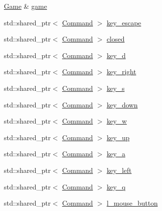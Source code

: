 \begin{DoxyCompactItemize}
\item 
\hyperlink{class_game}{Game} \& \hyperlink{class_engine_input_handler_a449d615b9968227381db153f57b7299d}{game}
\item 
std\+::shared\+\_\+ptr$<$ \hyperlink{class_command}{Command} $>$ \hyperlink{class_engine_input_handler_a864479881a1e214952f4a2aea3a307bf}{key\+\_\+escape}
\item 
std\+::shared\+\_\+ptr$<$ \hyperlink{class_command}{Command} $>$ \hyperlink{class_engine_input_handler_a0795da79edb03ad26aa5d8aec9fc2a04}{closed}
\item 
std\+::shared\+\_\+ptr$<$ \hyperlink{class_command}{Command} $>$ \hyperlink{class_engine_input_handler_a54e54d55b3fb0b52efcebe616849cdd1}{key\+\_\+d}
\item 
std\+::shared\+\_\+ptr$<$ \hyperlink{class_command}{Command} $>$ \hyperlink{class_engine_input_handler_ad74ef644e2130ed5552173993a358b20}{key\+\_\+right}
\item 
std\+::shared\+\_\+ptr$<$ \hyperlink{class_command}{Command} $>$ \hyperlink{class_engine_input_handler_ac8cb7f400955f76a2258a64f0812c309}{key\+\_\+s}
\item 
std\+::shared\+\_\+ptr$<$ \hyperlink{class_command}{Command} $>$ \hyperlink{class_engine_input_handler_a6812313632a9cf68132b99b4179ab1a4}{key\+\_\+down}
\item 
std\+::shared\+\_\+ptr$<$ \hyperlink{class_command}{Command} $>$ \hyperlink{class_engine_input_handler_adc4f776b64656ce3b549a1efcbba5dfb}{key\+\_\+w}
\item 
std\+::shared\+\_\+ptr$<$ \hyperlink{class_command}{Command} $>$ \hyperlink{class_engine_input_handler_a325f37f96aee129b9fc375c7a784798e}{key\+\_\+up}
\item 
std\+::shared\+\_\+ptr$<$ \hyperlink{class_command}{Command} $>$ \hyperlink{class_engine_input_handler_ae2da02fb4013bf0e85c951ad16efd48a}{key\+\_\+a}
\item 
std\+::shared\+\_\+ptr$<$ \hyperlink{class_command}{Command} $>$ \hyperlink{class_engine_input_handler_ae23b9a5cdfe4e076ca5337e5e4e17100}{key\+\_\+left}
\item 
std\+::shared\+\_\+ptr$<$ \hyperlink{class_command}{Command} $>$ \hyperlink{class_engine_input_handler_a87304a132a8502abc0d4b74abf104bfe}{key\+\_\+q}
\item 
std\+::shared\+\_\+ptr$<$ \hyperlink{class_command}{Command} $>$ \hyperlink{class_engine_input_handler_a1d5d91670520e1424bf5dac389d65069}{l\+\_\+mouse\+\_\+button}
\end{DoxyCompactItemize}
